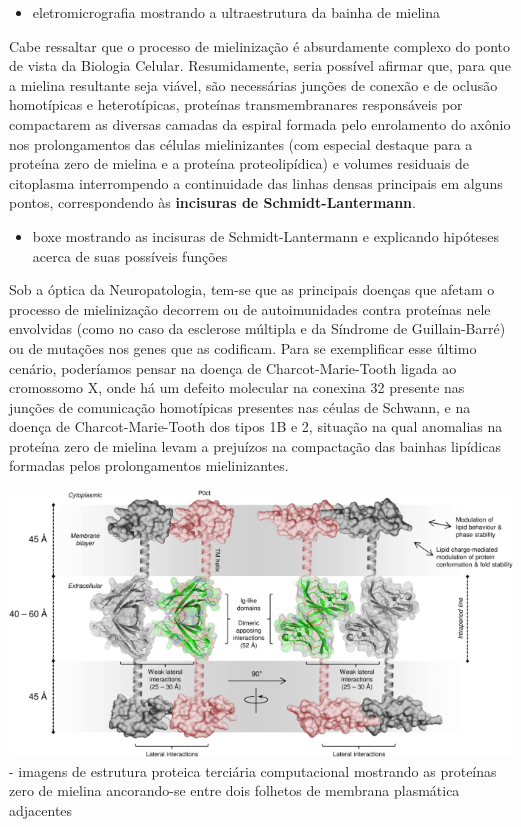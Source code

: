 \documentclass[
]{book}
\providecommand{\tightlist}{%
  \setlength{\itemsep}{0pt}\setlength{\parskip}{0pt}}
\theoremstyle{definition}
\theoremstyle{definition}
\theoremstyle{definition}
\theoremstyle{definition}
\theoremstyle{remark}
\begin{document}
\begin{itemize}
\tightlist
\item
  eletromicrografia mostrando a ultraestrutura da bainha de mielina
\end{itemize}

Cabe ressaltar que o processo de mielinização é absurdamente complexo do ponto de vista da Biologia Celular. Resumidamente, seria possível afirmar que, para que a mielina resultante seja viável, são necessárias junções de conexão e de oclusão homotípicas e heterotípicas, proteínas transmembranares responsáveis por compactarem as diversas camadas da espiral formada pelo enrolamento do axônio nos prolongamentos das células mielinizantes (com especial destaque para a proteína zero de mielina e a proteína proteolipídica) e volumes residuais de citoplasma interrompendo a continuidade das linhas densas principais em alguns pontos, correspondendo às \textbf{incisuras de Schmidt-Lantermann}.

\begin{itemize}
\tightlist
\item
  boxe mostrando as incisuras de Schmidt-Lantermann e explicando hipóteses acerca de suas possíveis funções
\end{itemize}

Sob a óptica da Neuropatologia, tem-se que as principais doenças que afetam o processo de mielinização decorrem ou de autoimunidades contra proteínas nele envolvidas (como no caso da esclerose múltipla e da Síndrome de Guillain-Barré) ou de mutações nos genes que as codificam. Para se exemplificar esse último cenário, poderíamos pensar na doença de Charcot-Marie-Tooth ligada ao cromossomo X, onde há um defeito molecular na conexina 32 presente nas junções de comunicação homotípicas presentes nas céulas de Schwann, e na doença de Charcot-Marie-Tooth dos tipos 1B e 2, situação na qual anomalias na proteína zero de mielina levam a prejuízos na compactação das bainhas lipídicas formadas pelos prolongamentos mielinizantes.

\includegraphics{images/neuro-p0myelin.png}
- imagens de estrutura proteica terciária computacional mostrando as proteínas zero de mielina ancorando-se entre dois folhetos de membrana plasmática adjacentes
\end{document}
